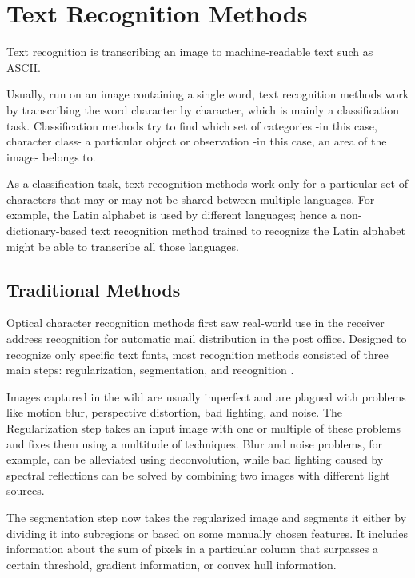 \section{Text Recognition Methods}
Text recognition is transcribing an image to machine-readable text such as ASCII.

Usually, run on an image containing a single word, text recognition methods work by transcribing the word character by character, which is mainly a classification task.
Classification methods try to find which set of categories -in this case, character class- a particular object or observation -in this case, an area of the image- belongs to.

As a classification task, text recognition methods work only for a particular set of characters that may or may not be shared between multiple languages. For example, the Latin alphabet is used by different languages; hence a non-dictionary-based text recognition method trained to recognize the Latin alphabet might be able to transcribe all those languages.
\subsection{Traditional Methods}
Optical character recognition methods first saw real-world use in the receiver address recognition for automatic mail distribution in the post office. Designed to recognize only specific text fonts, most recognition methods consisted of three main steps: regularization, segmentation, and recognition \cite{wang_object_2021}.

Images captured in the wild are usually imperfect and are plagued with problems like motion blur, perspective distortion, bad lighting, and noise. The Regularization step takes an input image with one or multiple of these problems and fixes them using a multitude of techniques. Blur and noise problems, for example, can be alleviated using deconvolution, while bad lighting caused by spectral reflections can be solved by combining two images with different light sources.

The segmentation step now takes the regularized image and segments it either by dividing it into subregions or based on some manually chosen features. It includes information about the sum of pixels in a particular column that surpasses a certain threshold, gradient information, or convex hull information.

